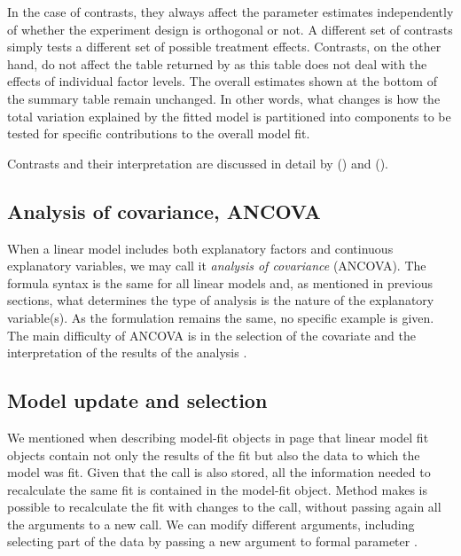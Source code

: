 \documentclass[krantz2]{krantz}\usepackage{knitr}
\begin{document}
In the case of contrasts, they always affect the parameter estimates independently of whether the experiment design is orthogonal or not. A different set of contrasts simply tests a different set of possible treatment effects. Contrasts, on the other hand, do not affect the table returned by  as this table does not deal with the effects of individual factor levels. The overall estimates shown at the bottom of the summary table remain unchanged. In other words, what changes is how the total variation explained by the fitted model is partitioned into components to be tested for specific contributions to the overall model fit.

Contrasts and their interpretation are discussed in detail by \citeauthor{Venables2002} (\citeyear{Venables2002}) and \citeauthor{Crawley2012} (\citeyear{Crawley2012}).

\subsection{Analysis of covariance, ANCOVA}

When a linear model includes both explanatory factors and continuous explanatory variables, we may call it \emph{analysis of covariance} (ANCOVA). The formula syntax is the same for all linear models and, as mentioned in previous sections, what determines the type of analysis is the nature of the explanatory variable(s). As the formulation remains the same, no specific example is given. The main difficulty of ANCOVA is in the selection of the covariate and the interpretation of the results of the analysis \autocite[e.g.][]{Smith1957}.

\subsection{Model update and selection}\label{sec:stat:update:step}
We mentioned when describing model-fit objects in page \pageref{box:LM:fit:object} that linear model fit objects contain not only the results of the fit but also the data to which the model was fit. Given that the call is also stored, all the information needed to recalculate the same fit is contained in the model-fit object. Method  makes is possible to recalculate the fit with changes to the call, without passing again all the arguments to a new call. We can modify different arguments, including selecting part of the data by passing a new argument to formal parameter .
\end{document}
